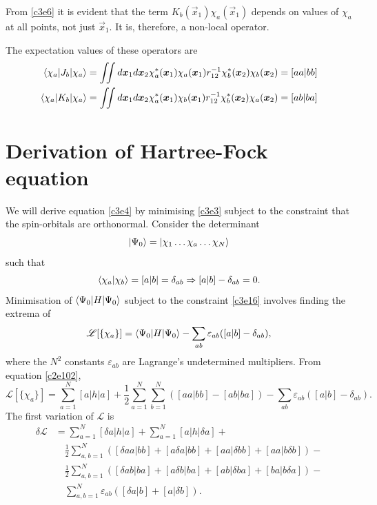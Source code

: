 From \eqref{c3e6} it is evident that the term $K_b(\vec{x}_1)\chi_a(\vec{x}_1)$
depends on values of $\chi_a$ at all points, not just $\vec{x}_1$. It is,
therefore, a non-local operator. 

The expectation values of these operators are
\begin{align}
\braket{\chi_a|J_b|\chi_a} &= \iint d\bm{x}_1d\bm{x}_2\chi_a^\ast(\bm{x}_1)
\chi_a(\bm{x}_1)r_{12}^{-1}\chi_b^\ast(\bm{x}_2)\chi_b(\bm{x}_2) = [aa|bb] 
\label{c3e14} \\
\braket{\chi_a|K_b|\chi_a} &= \iint d\bm{x}_1d\bm{x}_2\chi_a^\ast(\bm{x}_1)
\chi_b(\bm{x}_1)r_{12}^{-1}\chi_b^\ast(\bm{x}_2)\chi_a(\bm{x}_2) = [ab|ba] 
\label{c3e15}
\end{align}

\section{Derivation of Hartree-Fock equation}\label{c3s2}
We will derive equation \eqref{c3e4} by minimising \eqref{c3e3} subject to the
constraint that the spin-orbitals are orthonormal. Consider the determinant
\[
\ket{\Psi_0} = \ket{\chi_1\ldots\chi_a\ldots\chi_N}
\]
such that
\begin{equation}\label{c3e16}
\braket{\chi_a|\chi_b} = [a|b| = \delta_{ab} \Rightarrow [a|b] - \delta_{ab}=0.
\end{equation}
Minimisation of $\braket{\Psi_0|H|\Psi_0}$ subject to the constraint 
\eqref{c3e16} involves finding the extrema of
\begin{equation}\label{c3e17}
\mathscr{L}[\{\chi_a\}] = \braket{\Psi_0|H|\Psi_0} - \sum_{ab}\varepsilon_{ab}(
[a|b] - \delta_{ab}),
\end{equation}
where the $N^2$ constants $\varepsilon_{ab}$ are Lagrange's undetermined 
multipliers. From equation \eqref{c2e102},
\begin{equation}\label{c3e18}
\mathscr{L}[\{\chi_a\}] = \sum_{a=1}^N[a|h|a] + \frac{1}{2}\sum_{a=1}^N
\sum_{b=1}^N([aa|bb] - [ab|ba]) - \sum_{ab}\varepsilon_{ab}([a|b]-\delta_{ab}).
\end{equation}
The first variation of $\mathscr{L}$ is
\begin{equation}\label{c3e19}
\begin{aligned}
\delta\mathscr{L} &= \sum_{a=1}^N[\delta a|h|a] + \sum_{a=1}^N[a|h|\delta a] +\\
 &\quad\frac{1}{2}\sum_{a,b=1}^N\left([\delta aa|bb] + [a\delta a|bb] + 
 [aa|\delta bb] + [aa|b\delta b]\right) - \\
 &\quad\frac{1}{2}\sum_{a,b=1}^N\left([\delta ab|ba] + [a\delta b|ba] + 
 [ab|\delta ba] + [ba|b\delta a]\right) - \\
 &\quad\sum_{a,b=1}^N\varepsilon_{ab}([\delta a|b] + [a|\delta b]).
\end{aligned}
\end{equation}
